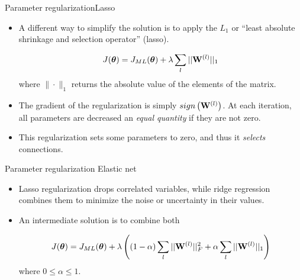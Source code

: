 \documentclass{beamer}
\begin{document}
\begin{frame}{Parameter regularization}{Lasso}
\begin{itemize}
    \item A different way to simplify the solution is to apply the $L_1$ or ``least absolute shrinkage and selection operator'' (lasso).
    
     \begin{equation}\label{eq:reg_cross_entropy}
J(\boldsymbol \theta) = J_{ML}(\boldsymbol \theta) + \lambda \sum_{l} ||{\bf W}^{(l)}||_1
\end{equation}
where $\|\cdot \|_1$ returns the absolute value of the elements of the matrix.  

\item The gradient of the regularization is simply $sign\left({\bf W}^{(l)}\right)$. At each iteration, all parameters are decreased an \emph{equal quantity} if they are not zero. 
\item This regularization sets some parameters to zero, and thus it \emph{selects} connections.
\end{itemize}
\end{frame}

\begin{frame}{Parameter regularization} {Elastic net}
\begin{itemize}
    \item Lasso regularization drops correlated variables, while ridge regression combines them to minimize the noise or uncertainty in their values. 
    \item An intermediate solution is to combine both
    
     \begin{equation}\label{eq:reg_cross_entropy}
J(\boldsymbol \theta) = J_{ML}(\boldsymbol \theta) + \lambda \left(  (1-\alpha)\sum_{l} ||{\bf W}^{(l)}||_F^2+ \alpha \sum_{l} ||{\bf W}^{(l)}||_1 \right)
\end{equation}
where $0 \leq \alpha \leq 1$.    
\end{itemize}
    
\end{frame}
\end{document}
